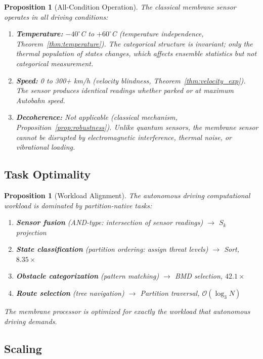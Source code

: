 \documentclass[twocolumn,10pt,a4paper]{article}
\newtheorem{proposition}[theorem]{Proposition}
\theoremstyle{definition}
\theoremstyle{remark}
\newcommand{\Sk}{S_k}
\begin{document}
\begin{proposition}[All-Condition Operation]
\label{prop:all_condition}
The classical membrane sensor operates in all driving conditions:
\begin{enumerate}[label=(\roman*)]
    \item \textbf{Temperature:} $-40^\circ$C to $+60^\circ$C (temperature independence, Theorem~\ref{thm:temperature}). The categorical structure is invariant; only the thermal population of states changes, which affects ensemble statistics but not categorical measurement.
    \item \textbf{Speed:} 0 to 300+ km/h (velocity blindness, Theorem~\ref{thm:velocity_exp}). The sensor produces identical readings whether parked or at maximum Autobahn speed.
    \item \textbf{Decoherence:} Not applicable (classical mechanism, Proposition~\ref{prop:robustness}). Unlike quantum sensors, the membrane sensor cannot be disrupted by electromagnetic interference, thermal noise, or vibrational loading.
\end{enumerate}
\end{proposition}

\subsection{Task Optimality}

\begin{proposition}[Workload Alignment]
\label{prop:workload}
The autonomous driving computational workload is dominated by partition-native tasks:
\begin{enumerate}[label=(\roman*)]
    \item \textbf{Sensor fusion} (AND-type: intersection of sensor readings) $\to$ $\Sk$ projection
    \item \textbf{State classification} (partition ordering: assign threat levels) $\to$ Sort, $8.35\times$
    \item \textbf{Obstacle categorization} (pattern matching) $\to$ BMD selection, $42.1\times$
    \item \textbf{Route selection} (tree navigation) $\to$ Partition traversal, $\mathcal{O}(\log_3 N)$
\end{enumerate}
The membrane processor is optimized for exactly the workload that autonomous driving demands.
\end{proposition}

\subsection{Scaling}
\end{document}
